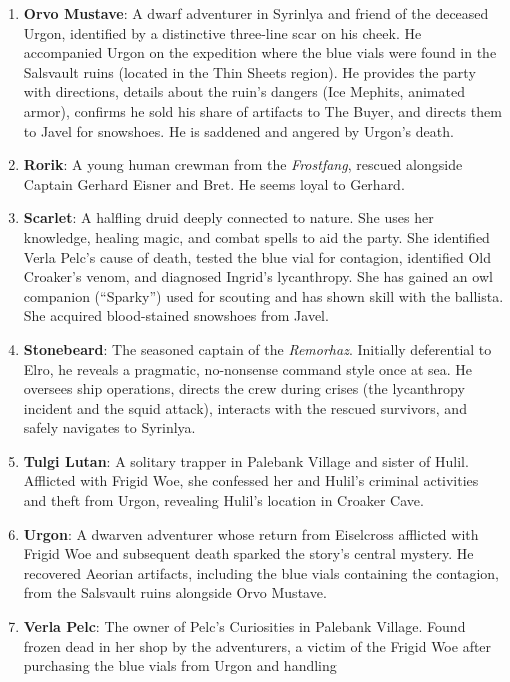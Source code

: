 \documentclass[
  letterpaper,12pt,twoside,twocolumn,openany,
  nodeprecatedcode,bg=full]{dndbook}
\begin{document}
\begin{enumerate}
  hands). It attacked Whisper when startled. Scarlet confirmed it is
  venomous.
\item
  \textbf{Orvo Mustave}: A dwarf adventurer in Syrinlya and friend of
  the deceased Urgon, identified by a distinctive three-line scar on his
  cheek. He accompanied Urgon on the expedition where the blue vials
  were found in the Salsvault ruins (located in the Thin Sheets region).
  He provides the party with directions, details about the ruin's
  dangers (Ice Mephits, animated armor), confirms he sold his share of
  artifacts to The Buyer, and directs them to Javel for snowshoes. He is
  saddened and angered by Urgon's death.
\item
  \textbf{Rorik}: A young human crewman from the \emph{Frostfang},
  rescued alongside Captain Gerhard Eisner and Bret. He seems loyal to
  Gerhard.
\item
  \textbf{Scarlet}: A halfling druid deeply connected to nature. She
  uses her knowledge, healing magic, and combat spells to aid the party.
  She identified Verla Pelc's cause of death, tested the blue vial for
  contagion, identified Old Croaker's venom, and diagnosed Ingrid's
  lycanthropy. She has gained an owl companion (``Sparky'') used for
  scouting and has shown skill with the ballista. She acquired
  blood-stained snowshoes from Javel.
\item
  \textbf{Stonebeard}: The seasoned captain of the \emph{Remorhaz}.
  Initially deferential to Elro, he reveals a pragmatic, no-nonsense
  command style once at sea. He oversees ship operations, directs the
  crew during crises (the lycanthropy incident and the squid attack),
  interacts with the rescued survivors, and safely navigates to
  Syrinlya.
\item
  \textbf{Tulgi Lutan}: A solitary trapper in Palebank Village and
  sister of Hulil. Afflicted with Frigid Woe, she confessed her and
  Hulil's criminal activities and theft from Urgon, revealing Hulil's
  location in Croaker Cave.
\item
  \textbf{Urgon}: A dwarven adventurer whose return from Eiselcross
  afflicted with Frigid Woe and subsequent death sparked the story's
  central mystery. He recovered Aeorian artifacts, including the blue
  vials containing the contagion, from the Salsvault ruins alongside
  Orvo Mustave.
\item
  \textbf{Verla Pelc}: The owner of Pelc's Curiosities in Palebank
  Village. Found frozen dead in her shop by the adventurers, a victim of
  the Frigid Woe after purchasing the blue vials from Urgon and handling

\end{enumerate}
\end{document}
